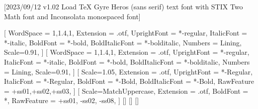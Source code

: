 
[2023/09/12 v1.02 Load TeX Gyre Heros (sans serif) text font with STIX Two Math font and Inconsolata monospaced font]

%
%
\ifpdftex
	\RequirePackage[T1]{fontenc}
	\RequirePackage{bm}
\else
    \RequirePackage[warnings-off={mathtools-colon,mathtools-overbracket}]{unicode-math}

    \setmainfont{texgyreheros}[%
		WordSpace = {1,1.4,1},
		Extension = .otf,
    	UprightFont = *-regular,
    	ItalicFont = *-italic,
    	BoldFont = *-bold,
    	BoldItalicFont = *-bolditalic,
		Numbers = Lining,
    	Scale=0.91,
	]        
    \setsansfont{texgyreheros}[%
		WordSpace = {1,1.4,1},
		Extension = .otf,
    	UprightFont = *-regular,
    	ItalicFont = *-italic,
    	BoldFont = *-bold,
    	BoldItalicFont = *-bolditalic,
		Numbers = Lining,
    	Scale=0.91,
	]        
   \setmonofont{Inconsolatazi4}[%
        Scale=1.05,
        Extension = .otf,
        UprightFont = *-Regular,
        ItalicFont = *-Regular,%
        BoldFont = *-Bold, 
    	BoldItalicFont = *-Bold,%
        RawFeature = {+ss01,+ss02,+ss03},
    ]             
    [%
    	Scale=MatchUppercase,
    	Extension = .otf,
		BoldFont = *,%
    	RawFeature = {+ss01, -ss02, -ss08},
    ]
    \setmathfontface{}[]%
    \setmathfontface{}[]
    \setmathfontface{}[]%
    \newcommand*{\FRAC}[1]{{\addfontfeature{Fractions=On}#1}}%
\fi
